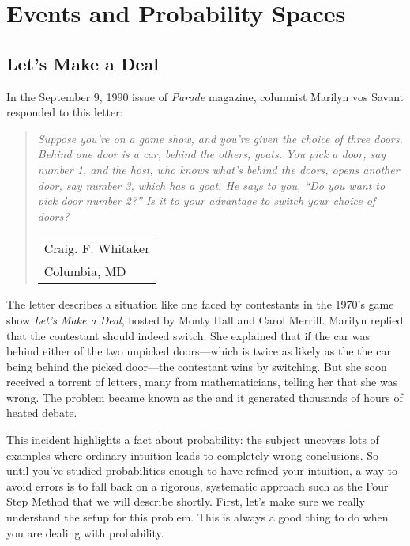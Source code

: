 \chapter{Events and Probability Spaces}\label{probability_chap}

\section{Let's Make a Deal}\label{monty_sec}

In the September 9, 1990 issue of \emph{Parade} magazine, columnist
Marilyn vos Savant responded to this letter:


\begin{quote}
\emph{Suppose you're on a game show, and you're given the
choice of three doors.  Behind one door is a car, behind the others,
goats.  You pick a door, say number 1, and the host, who knows what's
behind the doors, opens another door, say number 3, which has a goat.
He says to you, ``Do you want to pick door number 2?''  Is it to your
advantage to switch your choice of doors?}
\begin{flushright}
\begin{tabular}{l}
Craig. F. Whitaker \\
Columbia, MD
\end{tabular}
\end{flushright}
\end{quote}

The letter describes a situation like one faced by contestants in the
1970's game show \emph{Let's Make a Deal}, hosted by Monty Hall and
Carol Merrill.  Marilyn replied that the contestant should indeed
switch.  She explained that if the car was behind either of the two
unpicked doors---which is twice as likely as the the car being behind
the picked door---the contestant wins by switching.  But she soon
received a torrent of letters, many from mathematicians, telling her
that she was wrong.  The problem became known as the  and it generated thousands of hours of heated debate.

This incident highlights a fact about probability: the subject uncovers
lots of examples where ordinary intuition leads to completely wrong
conclusions.  So until you've studied probabilities enough to have
refined your intuition, a way to avoid errors is to fall back on a
rigorous, systematic approach such as the Four Step Method that we
will describe shortly.  First, let's make sure we really understand
the setup for this problem.  This is always a good thing to do when
you are dealing with probability.

